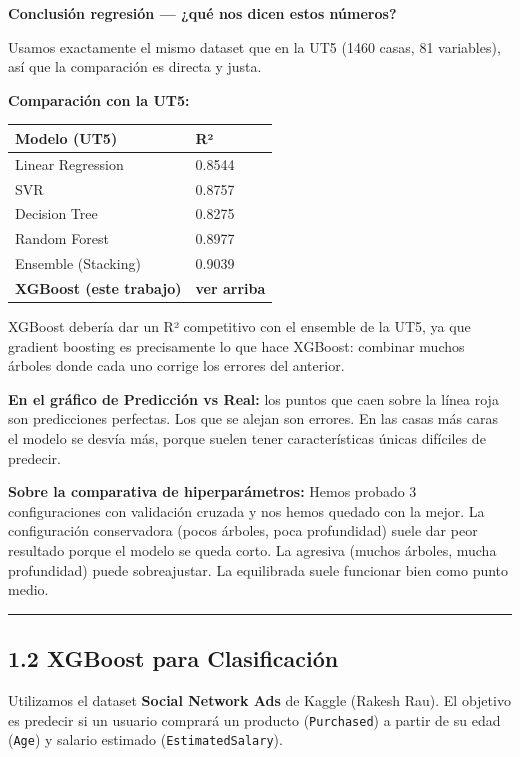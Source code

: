 \documentclass[11pt]{article}
\begin{document}
    \textbf{Conclusión regresión --- ¿qué nos dicen estos números?}

Usamos exactamente el mismo dataset que en la UT5 (1460 casas, 81
variables), así que la comparación es directa y justa.

\textbf{Comparación con la UT5:}

{\def\LTcaptype{none} %
\begin{longtable}[]{@{}ll@{}}
\toprule\noalign{}
Modelo (UT5) & R² \\
\midrule\noalign{}
\endhead
\bottomrule\noalign{}
\endlastfoot
Linear Regression & 0.8544 \\
SVR & 0.8757 \\
Decision Tree & 0.8275 \\
Random Forest & 0.8977 \\
Ensemble (Stacking) & 0.9039 \\
\textbf{XGBoost (este trabajo)} & \textbf{ver arriba} \\
\end{longtable}
}

XGBoost debería dar un R² competitivo con el ensemble de la UT5, ya que
gradient boosting es precisamente lo que hace XGBoost: combinar muchos
árboles donde cada uno corrige los errores del anterior.

\textbf{En el gráfico de Predicción vs Real:} los puntos que caen sobre
la línea roja son predicciones perfectas. Los que se alejan son errores.
En las casas más caras el modelo se desvía más, porque suelen tener
características únicas difíciles de predecir.

\textbf{Sobre la comparativa de hiperparámetros:} Hemos probado 3
configuraciones con validación cruzada y nos hemos quedado con la mejor.
La configuración conservadora (pocos árboles, poca profundidad) suele
dar peor resultado porque el modelo se queda corto. La agresiva (muchos
árboles, mucha profundidad) puede sobreajustar. La equilibrada suele
funcionar bien como punto medio.

    \begin{center}\rule{0.5\linewidth}{0.5pt}\end{center}

\subsection{1.2 XGBoost para
Clasificación}\label{xgboost-para-clasificaciuxf3n}

Utilizamos el dataset \textbf{Social Network Ads} de Kaggle (Rakesh
Rau). El objetivo es predecir si un usuario comprará un producto
(\texttt{Purchased}) a partir de su edad (\texttt{Age}) y salario
estimado (\texttt{EstimatedSalary}).
\end{document}
